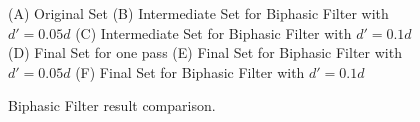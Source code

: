 \begin{figure}[H]
\begin{subfigure}[b]{1\linewidth}
\begin{subfigure}[b]{0.29\linewidth}
  	\caption{} 
  	\label{fig:bp10_2_sweden} 
  	\vspace{4ex}
  \end{subfigure}
\end{subfigure}
  \caption{Biphasic Filter result comparison.}
  \centering \small
  \parbox{0.5\linewidth}{(A) Original Set (B) Intermediate Set for Biphasic Filter with $d'=0.05d$ (C) Intermediate Set for Biphasic Filter with $d'=0.1d$ (D) Final Set for one pass (E) Final Set for Biphasic Filter with $d'=0.05d$ (F) Final Set for Biphasic Filter with $d'=0.1d$ }
  \label{fig:bp_sweden} 
\end{figure}

